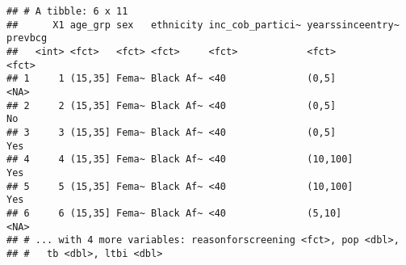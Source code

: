\documentclass[]{article}
\newenvironment{Shaded}{\begin{snugshade}}{\end{snugshade}}
\newcommand{\CommentTok}[1]{\textcolor[rgb]{0.56,0.35,0.01}{\textit{#1}}}
\newcommand{\DataTypeTok}[1]{\textcolor[rgb]{0.13,0.29,0.53}{#1}}
\newcommand{\KeywordTok}[1]{\textcolor[rgb]{0.13,0.29,0.53}{\textbf{#1}}}
\newcommand{\NormalTok}[1]{#1}
\newcommand{\OperatorTok}[1]{\textcolor[rgb]{0.81,0.36,0.00}{\textbf{#1}}}
\newcommand{\StringTok}[1]{\textcolor[rgb]{0.31,0.60,0.02}{#1}}
\begin{document}
\begin{verbatim}
## # A tibble: 6 x 11
##      X1 age_grp sex   ethnicity inc_cob_partici~ yearssinceentry~ prevbcg
##   <int> <fct>   <fct> <fct>     <fct>            <fct>            <fct>  
## 1     1 (15,35] Fema~ Black Af~ <40              (0,5]            <NA>   
## 2     2 (15,35] Fema~ Black Af~ <40              (0,5]            No     
## 3     3 (15,35] Fema~ Black Af~ <40              (0,5]            Yes    
## 4     4 (15,35] Fema~ Black Af~ <40              (10,100]         Yes    
## 5     5 (15,35] Fema~ Black Af~ <40              (10,100]         Yes    
## 6     6 (15,35] Fema~ Black Af~ <40              (5,10]           <NA>   
## # ... with 4 more variables: reasonforscreening <fct>, pop <dbl>,
## #   tb <dbl>, ltbi <dbl>
\end{verbatim}

\begin{Shaded}
\end{Shaded}
\end{document}
